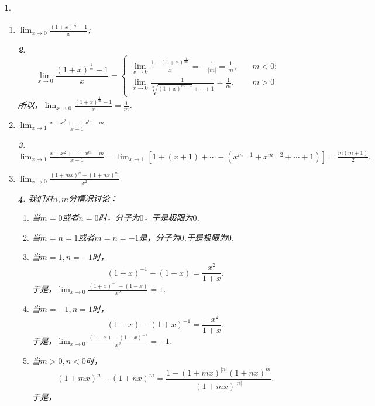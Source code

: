 \documentclass[utf8]{book}
\newtheorem{example}{}[section]             %
\newtheorem{solution}{}
\begin{document}
\begin{example}
\begin{enumerate}
\begin{solution}
\begin{equation*}
\displaystyle\lim_{x\to 1}\frac{x^m-1}{x^n-1}=
\begin{cases}
\text{无定义}, \quad&n=0;\\
0,\quad&m=0;\\
\displaystyle\frac{m}{n},\quad&m\neq 0, n\neq 0.
\end{cases}
\end{equation*}
\end{solution}
\item $\displaystyle\lim_{x\to 0}\frac{(1+x)^{\frac{1}{m}}-1}{x}$;
\begin{solution}
\begin{equation*}
\displaystyle\lim_{x\to 0}\frac{(1+x)^{\frac{1}{m}}-1}{x}=
\begin{cases}
\displaystyle\lim_{x\to 0}\frac{1-(1+x)^{\frac{1}{|m|}}}{x}=-\frac{1}{|m|}=\frac{1}{m}, \quad&m<0;\\
\displaystyle\lim_{x\to 0}\frac{1}{\sqrt[m]{(1+x)^{m-1}}+\cdots + 1}=\frac{1}{m},\quad&m>0
\end{cases}
\end{equation*}
所以，$\displaystyle\lim_{x\to 0}\frac{(1+x)^{\frac{1}{m}}-1}{x}=\frac{1}{m}$.
\end{solution}
\item $\displaystyle\lim_{x\to 1}\frac{x+x^2+\cdots+x^m-m}{x-1}$
\begin{solution}
$\displaystyle\lim_{x\to 1}\frac{x+x^2+\cdots+x^m-m}{x-1}=\displaystyle\lim_{x\to 1}\left[1+(x+1)+\cdots+(x^{m-1}+x^{m-2}+\cdots+1)\right]=\frac{m(m+1)}{2}.$
\end{solution}
\item $\displaystyle\lim_{x\to 0}\frac{(1+mx)^n-(1+nx)^m}{x^2}$
\begin{solution}我们对$n,m$分情况讨论：
\renewcommand\labelenumi{\normalfont(\theenumi)}
\begin{enumerate}
\item 当$m=0$或者$n=0$时，分子为$0$，于是极限为$0$.
\item 当$m=n=1$或者$m=n=-1$是，分子为$0$,于是极限为$0$.
\item 当$m=1,n=-1$时，$$(1+x)^{-1}-(1-x)=\frac{x^2}{1+x}.$$于是，$\displaystyle\lim_{x\to 0}\frac{(1+x)^{-1}-(1-x)}{x^2}=1$.
\item 当$m=-1,n=1$时，$$(1-x)-(1+x)^{-1} = \frac{-x^2}{1+x}.$$于是，$\displaystyle\lim_{x\to 0}\frac{(1-x)-(1+x)^{-1}}{x^2}=-1$.
\item 当$m>0, n<0$时，$$(1+mx)^n-(1+nx)^m =\frac{1-(1+mx)^{|n|}(1+nx)^m}{(1+mx)^{|n|}}.$$于是，

\end{enumerate}
\end{solution}
\end{enumerate}
\end{example}
\end{document}
